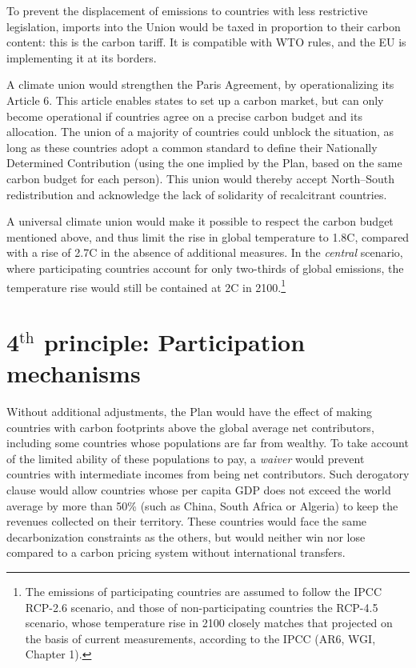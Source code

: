 \documentclass[a5paper,english,openany]{memoir}
\begin{document}
 

To prevent the displacement of emissions to countries with less restrictive legislation, imports into the Union would be taxed in proportion to their carbon content: this is the carbon tariff. It is compatible with WTO rules, and the EU is implementing it at its borders.

A climate union would strengthen the Paris Agreement, by operationalizing its Article 6. This article enables states to set up a carbon market, but can only become operational if countries agree on a precise carbon budget and its allocation. The union of a majority of countries could unblock the situation, as long as these countries adopt a common standard to define their Nationally Determined Contribution (using the one implied by the Plan, based on the same carbon budget for each person). This union would thereby accept North--South redistribution and acknowledge the lack of solidarity of recalcitrant countries. 

A universal climate union would make it possible to respect the carbon budget mentioned above, and thus limit the rise in global temperature to 1.8\textdegree{}C, compared with a rise of 2.7\textdegree{}C in the absence of additional measures. In the \textit{central} scenario, where participating countries account for only two-thirds of global emissions, the temperature rise would still be contained at 2\textdegree{}C in 2100.\footnote{The emissions of participating countries are assumed to follow the IPCC RCP-2.6 scenario, and those of non-participating countries the RCP-4.5 scenario, whose temperature rise in 2100 closely matches that projected on the basis of current measurements, according to the IPCC (AR6, WGI, Chapter 1).}

\section{4$^\text{th}$ principle: Participation mechanisms}

Without additional adjustments, the Plan would have the effect of making countries with carbon footprints above the global average net contributors, including some countries whose populations are far from wealthy. To take account of the limited ability of these populations to pay, a \textit{waiver} would prevent countries with intermediate incomes from being net contributors. Such derogatory clause would allow countries whose per capita GDP does not exceed the world average by more than 50\% (such as China, South Africa or Algeria) to keep the revenues collected on their territory. These countries would face the same decarbonization constraints as the others, but would neither win nor lose compared to a carbon pricing system without international transfers. 
\end{document}
